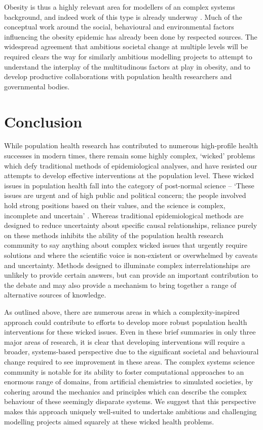 \documentclass[review]{elsarticle}
\begin{document}
Obesity is thus a highly relevant area for modellers of an complex systems background, and indeed work of this type is already underway \citep{silverman2017}.  Much of the conceptual work around the social, behavioural and environmental factors influencing the obesity epidemic has already been done by respected sources.  The widespread agreement that ambitious societal change at multiple levels will be required clears the way for similarly ambitious modelling projects to attempt to understand the interplay of the multitudinous factors at play in obesity, and to develop productive collaborations with population health researchers and governmental bodies.

\section{Conclusion}

While population health research has contributed to numerous high-profile health successes in modern times, there remain some highly complex, `wicked' problems which defy traditional methods of epidemiological analyses, and have resisted our attempts to develop effective interventions at the population level.  These wicked issues in population health fall into the category of post-normal science -- `These issues are urgent and of high public and political concern; the people involved hold strong positions based on their values, and the science is complex, incomplete and uncertain' \citep[][p. 163]{gluckman2014}. Whereas traditional epidemiological methods are designed to reduce uncertainty about specific causal relationships, reliance purely on these methods inhibits the ability of the population health research community to say anything about complex wicked issues that urgently require solutions and where the scientific voice is non-existent or overwhelmed by caveats and uncertainty. Methods designed to illuminate complex interrelationships are unlikely to provide certain answers, but can provide an important contribution to the debate and may also provide a mechanism to bring together a range of alternative sources of knowledge. 

As outlined above, there are numerous areas in which a complexity-inspired approach could contribute to efforts to develop more robust population health interventions for these wicked issues.  Even in these brief summaries in only three major areas of research, it is clear that developing interventions will require a broader, systems-based perspective due to the significant societal and behavioural change required to see improvement in these areas.  The complex systems science community is notable for its ability to foster computational approaches to an enormous range of domains, from artificial chemistries to simulated societies, by cohering around the mechanics and principles which can describe the complex behaviour of these seemingly disparate systems.  We suggest that this perspective makes this approach uniquely well-suited to undertake ambitious and challenging modelling projects aimed squarely at these wicked health problems.
\end{document}
